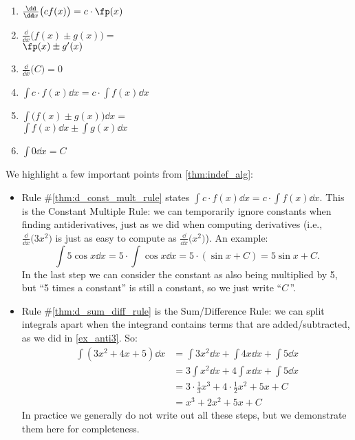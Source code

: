\begin{theorem}\label{thm:indef_alg}
\mbox{}\\[-2.5\baselineskip]
\parbox[t]{\linewidth}{\begin{multicols}{2}
\begin{enumerate}
\item\label{thm:d_const_mult_rule} $\frac{\dd}{\dd x}\bigl(cf(x) \bigr) = c\cdot \fp(x)$
\item\label{thm:d_sum_diff_rule} $\frac{\dd}{\dd x}\bigl(f(x)\pm g(x) \bigr) =$ \\
\null\qquad$\fp(x)\pm g'(x)$
\item $\frac{\dd}{\dd x}\bigl(C \bigr) = 0$
\setcounter{enumi}{0}
\item $\int c\cdot f(x)\dd x = c\cdot \int f(x)\dd x$
\item $\int \bigl(f(x)\pm g(x)\bigr)\dd x =$ \\
\null\qquad$\int f(x)\dd x\pm \int g(x)\dd x$
\item $\int 0\dd x = C$
\end{enumerate}
\end{multicols}}
\end{theorem}

We highlight a few important points from \autoref{thm:indef_alg}:
\begin{itemize}
	\item	Rule \#\ref{thm:d_const_mult_rule} states $\int c\cdot f(x)\dd x = c\cdot \int f(x)\dd x$. This is the Constant Multiple Rule: we can temporarily ignore constants when finding antiderivatives, just as we did when computing derivatives (i.e., $\frac{\dd}{\dd x}\bigl(3x^2\bigr)$ is just as easy to compute as $\frac{\dd}{\dd x}\bigl(x^2\bigr)$). An example:
	\[\int 5\cos x\dd x = 5\cdot\int \cos x\dd x = 5\cdot (\sin x+C) = 5\sin x + C.\]
	In the last step we can consider the constant as also being multiplied by 5, but ``5 times a constant'' is still a constant, so we just write ``$C$\,''.
	\item	Rule \#\ref{thm:d_sum_diff_rule} is the Sum/Difference Rule: we can split integrals apart when the integrand contains terms that are added/subtracted, as we did in \autoref{ex_anti3}. So:
	\begin{align*}
		\int(3x^2+4x+5)\dd x
		&= \int 3x^2\dd x + \int 4x\dd x + \int 5\dd x \\
		&= 3\int x^2\dd x + 4\int x\dd x + \int 5\dd x\\
		&= 3\cdot \frac13x^3 + 4\cdot \frac12x^2+5x+C\\
		&= x^3+2x^2+5x+C
	\end{align*}
	In practice we generally do not write out all these steps, but we demonstrate them here for completeness.
\end{itemize}

